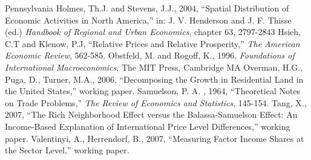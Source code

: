 \documentclass[12pt]{article}
\begin{document}
\begin{thebibliography}{99}
{Pennsylvania}
 Holmes, Th.J. and Stevens, J.J., 2004, ``Spatial Distribution of Economic Activities in North America,'' in: J. V. Henderson and J. F. Thisse (ed.) \emph{Handbook of Regional and Urban Economics}, chapter 63, 2797-2843
 Hsieh, C.T and Klenow, P.J, ``Relative Prices and
Relative Prosperity,'' \emph{The American Economic Review}, 562-585.
 Obstfeld, M. and Rogoff, K., 1996, \emph{Foundations of International Macroeconomics}, The MIT Press, Cambridge MA
 Overman, H.G., Puga, D., Turner, M.A., 2006, ``Decomposing the Growth in Residential Land in the United States,'' working paper.
 Samuelson, P. A. , 1964, ``Theoretical Notes on Trade Problems,'' \emph{The Review of Economics and Statistics}, 145-154.
\bibitem{} Tang, X., 2007, ``The Rich Neighborhood Effect versus the Balassa-Samuelson Effect: An Income-Based Explanation of International Price Level Differences,'' working paper.
 Valentinyi, A., Herrendorf, B., 2007, ``Measuring Factor Income Shares at the Sector Level,'' working paper.
\end{thebibliography}
\end{document}
